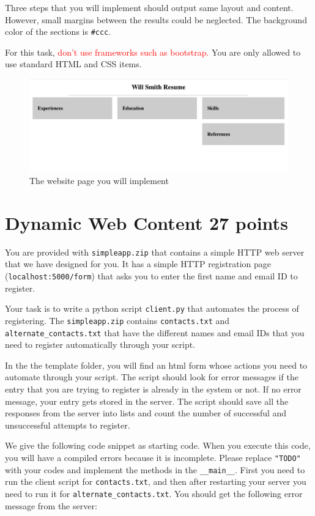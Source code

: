 \documentclass{resources/WeSTassignment}
\begin{document}
Three steps that you will implement should output same layout and content. However, small margins between the results could be neglected. The background color of the sections is \texttt{\#ccc}.

For this task, \textcolor{red}{don't use frameworks such as bootstrap.} You are only allowed to use standard HTML and CSS items. 

\begin{figure}[ht]
    \centering
    \includegraphics[scale=0.4]{html.png}
    \caption{The website page you will implement}
    \label{fig:my_label}
\end{figure}

\section{Dynamic Web Content \hfill{27 points}}
You are provided with \texttt{simpleapp.zip} that contains a simple HTTP web server that we
have designed for you. It has a simple HTTP registration page (\texttt{localhost:5000/form})
that asks you to enter the first name and email ID to register.


Your task is to write a python script \texttt{client.py} that automates the process of registering.
The \texttt{simpleapp.zip} contains \texttt{contacts.txt} and \texttt{alternate\_contacts.txt} that have the different names and email IDs that you need to register automatically through your script.


In the the template folder, you will find an html form whose actions you need to automate
through your script. The script should look for error messages if the entry that you are
trying to register is already in the system or not. If no error message, your entry gets
stored in the server. The script should save all the responses from the server into lists and count the number of successful and unsuccessful attempts to register. 

We give the following code snippet as starting code. When you execute this code, you will have a compiled errors because it is incomplete. Please replace \texttt{"TODO"} with your codes and implement the methods in the \texttt{\_\_main\_\_}. First you need to run the client script for \texttt{contacts.txt}, and then after restarting your server you need to run it for \texttt{alternate\_contacts.txt}. You should get the following error message from the server:
\end{document}
